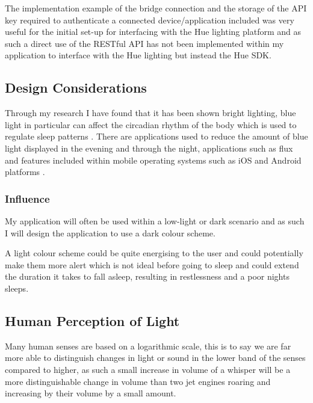 The implementation example of the bridge connection and the storage of
the API key required to authenticate a connected device/application
included was very useful for the initial set-up for interfacing with the
Hue lighting platform and as such a direct use of the RESTful API has
not been implemented within my application to interface with the Hue
lighting but instead the Hue SDK.

\subsection{Design Considerations}\label{design-considerations}

Through my research I have found that it has been shown bright lighting,
blue light in particular can affect the circadian rhythm of the body
which is used to regulate sleep patterns \cite{oh2015analysis}. There
are applications used to reduce the amount of blue light displayed in
the evening and through the night, applications such as flux
\parencite{flux} and features included within mobile operating systems
such as iOS \parencite{iosNightShift} and Android platforms
\parencite{samsungBlueFilter}.

\subsubsection{Influence}\label{influence-1}

My application will often be used within a low-light or dark scenario
and as such I will design the application to use a dark colour scheme.

A light colour scheme could be quite energising to the user and could
potentially make them more alert which is not ideal before going to
sleep and could extend the duration it takes to fall asleep, resulting
in restlessness and a poor nights sleeps.

\subsection{Human Perception of Light}\label{human-perception-of-light}

Many human senses are based on a logarithmic scale, this is to say we
are far more able to distinguish changes in light or sound in the lower
band of the senses compared to higher, as such a small increase in
volume of a whisper will be a more distinguishable change in volume than
two jet engines roaring and increasing by their volume by a small
amount.

